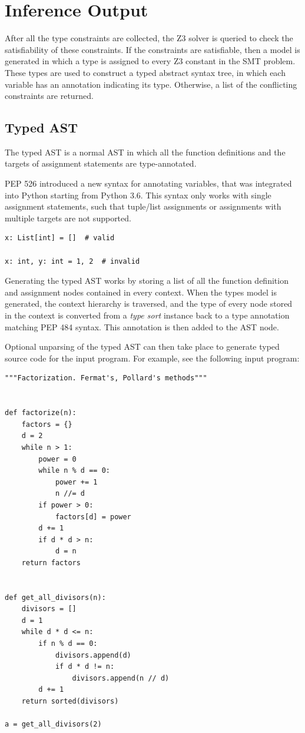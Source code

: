 \section{Inference Output}
After all the type constraints are collected, the Z3 solver is queried to check the satisfiability of these constraints. If the constraints are satisfiable, then a model is generated in which a type is assigned to every Z3 constant in the SMT problem. These types are used to construct a typed abstract syntax tree, in which each variable has an annotation indicating its type. Otherwise, a list of the conflicting constraints are returned.
\subsection{Typed AST}
The typed AST is a normal AST in which all the function definitions and the targets of assignment statements are type-annotated.

PEP 526 \cite{526} introduced a new syntax for annotating variables, that was integrated into Python starting from Python 3.6. This syntax only works with single assignment statements, such that tuple/list assignments or assignments with multiple targets are not supported.

\begin{lstlisting}
x: List[int] = []  # valid

x: int, y: int = 1, 2  # invalid
\end{lstlisting}

Generating the typed AST works by storing a list of all the function definition and assignment nodes contained in every context. When the types model is generated, the context hierarchy is traversed, and the type of every node stored in the context is converted from a \textit{type sort} instance back to a type annotation matching PEP 484 syntax. This annotation is then added to the AST node.

Optional unparsing of the typed AST can then take place to generate typed source code for the input program. For example, see the following input program:
\begin{lstlisting}
"""Factorization. Fermat's, Pollard's methods"""


def factorize(n):
	factors = {}
	d = 2
	while n > 1:
		power = 0
		while n % d == 0:
			power += 1
			n //= d
		if power > 0:
			factors[d] = power
		d += 1
		if d * d > n:
			d = n
	return factors


def get_all_divisors(n):
	divisors = []
	d = 1
	while d * d <= n:
		if n % d == 0:
			divisors.append(d)
			if d * d != n:
				divisors.append(n // d)
		d += 1
	return sorted(divisors)

a = get_all_divisors(2)
\end{lstlisting}

